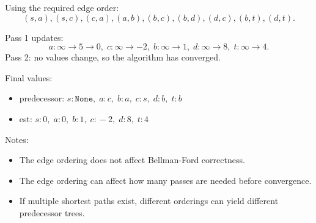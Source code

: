 \begin{prob}
    \begin{soln}
        Using the required edge order:
        \[
            (s,a), (s,c), (c,a), (a,b), (b,c), (b,d), (d,c), (b,t), (d,t).
        \]

        Pass 1 updates:
        \[
            a: \infty \to 5 \to 0,\;
            c: \infty \to -2,\;
            b: \infty \to 1,\;
            d: \infty \to 8,\;
            t: \infty \to 4.
        \]
        Pass 2: no values change, so the algorithm has converged.

        Final values:
        \begin{itemize}
            \item predecessor: $s\!:\!\texttt{None},\; a\!:\!c,\; b\!:\!a,\; c\!:\!s,\; d\!:\!b,\; t\!:\!b$
            \item est: $s\!:\!0,\; a\!:\!0,\; b\!:\!1,\; c\!:\!-2,\; d\!:\!8,\; t\!:\!4$
        \end{itemize}

        Notes:
        \begin{itemize}
            \item The edge ordering does not affect Bellman-Ford correctness.
            \item The edge ordering can affect how many passes are needed before convergence.
            \item If multiple shortest paths exist, different orderings can yield different predecessor trees.
        \end{itemize}
    \end{soln}
\end{prob}
